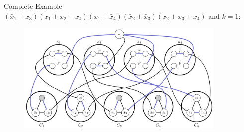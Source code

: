 \begin{frame}{Complete Example}
    \centering
    $(\bar{x}_1 + x_3)(x_1 + x_2 + x_4)(x_1 + \bar{x}_4)(\bar{x}_2 + \bar{x}_3)(x_2 + x_3 + x_4)$ and $k=1$:
    \begin{figure}
        \centering
        \includegraphics[width=0.9\textwidth]{images/reduction/full.png}
    \end{figure}
\end{frame}
